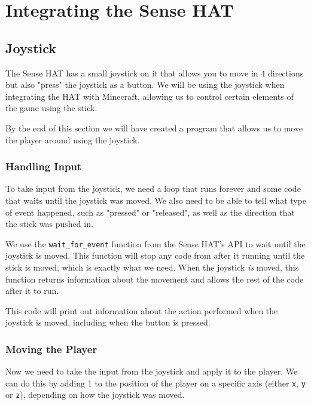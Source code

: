 \section{Integrating the Sense HAT}
	\subsection{Joystick}

		The Sense HAT has a small joystick on it that allows you to move in 4 directions but also "press" the joystick as a button. We will be using the joystick when integrating the HAT with Minecraft, allowing us to control certain elements of the game using the stick.

		By the end of this section we will have created a program that allows us to move the player around using the joystick.

		\subsubsection{Handling Input}

			To take input from the joystick, we need a loop that runs forever and some code that waits until the joystick was moved. We also need to be able to tell what type of event happened, such as "pressed" or "released", as well as the direction that the stick was pushed in.

			We use the \texttt{wait\_for\_event} function from the Sense HAT's API to wait until the joystick is moved. This function will stop any code from after it running until the stick is moved, which is exactly what we need. When the joystick \textit{is} moved, this function returns information about the movement and allows the rest of the code after it to run.

			

			This code will print out information about the action performed when the joystick is moved, including when the button is pressed.

		\subsubsection{Moving the Player}

			Now we need to take the input from the joystick and apply it to the player. We can do this by adding 1 to the position of the player on a specific axis (either \texttt{x}, \texttt{y} or \texttt{z}), depending on how the joystick was moved.

